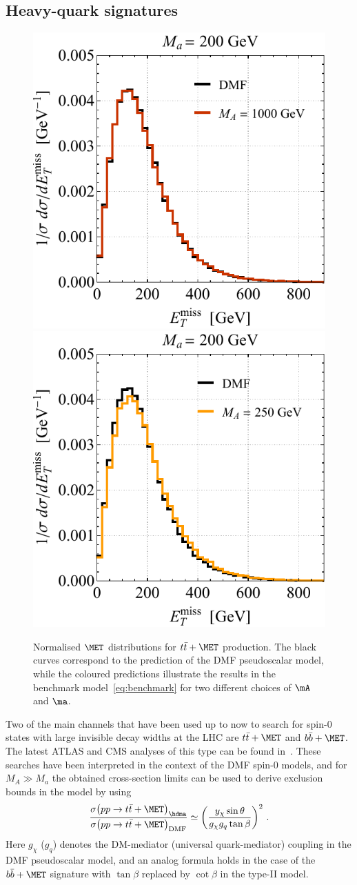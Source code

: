 \subsection*{Heavy-quark signatures}

\begin{figure}[t!]
\centering
\includegraphics[height=0.45\textwidth]{texinputs/04_grid/newfigures/ttmetl.pdf} \qquad 
\includegraphics[height=0.45\textwidth]{texinputs/04_grid/newfigures/ttmetr.pdf}
\vspace{2mm}
\caption{\label{fig:ttmet} Normalised $\MET$ distributions for $t \bar t + \MET$ production. The black curves correspond to the prediction of the DMF pseudoscalar   model, while the coloured predictions illustrate the results in the \hdma benchmark model~\eqref{eq:benchmark} for two different choices of $\mA$ and $\ma$.} 
\end{figure}

Two of the main channels that have been used up to now  to search for spin-0 states with large invisible decay widths at the LHC are $t \bar t + \MET$ and $b \bar b + \MET$. The latest ATLAS and CMS analyses of this type can be found in~\cite{Aaboud:2017rzf,CMS-PAS-EXO-16-049}. These searches have been interpreted in the context of the DMF spin-0   models, and for $M_A \gg M_a$ the obtained cross-section limits can be used  to derive exclusion bounds in the \hdma model by using~\cite{Bauer:2017ota}
\begin{equation} \label{eq:rescaling}
\frac{\sigma \! \left ( pp \to t \bar t + \MET\right )_{\hdma}}{\sigma \! \left ( pp \to t \bar t + \MET\right )_{\rm DMF}} \simeq \left ( \frac{y_\chi \sin \theta}{g_\chi g_q \tan \beta} \right )^2 \, .
\end{equation}
Here $g_\chi$ ($g_q$) denotes the DM-mediator (universal quark-mediator) coupling in the DMF  pseudoscalar  model, and an analog formula holds in the case of the $b \bar b + \MET$ signature with $\tan \beta$ replaced by $\cot \beta$ in the type-II \hdma model. 

